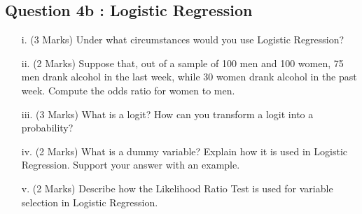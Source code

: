 \documentclass[a4paper,12pt]{article}
\begin{document}
\subsection*{Question 4b : Logistic Regression} %
\begin{itemize}
\item[i.](3 Marks) Under what circumstances would you use Logistic Regression?
\end{itemize}

%

\begin{itemize}
\item[ii.](2 Marks) Suppose that, out of a sample of 100 men and 100 women, 75 men drank alcohol in the last week, while 30 women drank alcohol in the past week. Compute the odds ratio for women to men.
\item[iii.](3 Marks)
What is a logit? How can you transform a logit into a probability?
\item[iv.](2 Marks)
What is a dummy variable? Explain how it is used in Logistic Regression. Support your answer with an example.
\item[v.](2 Marks) Describe how the Likelihood Ratio Test is used for variable selection in Logistic Regression.
\end{itemize}
\end{document}
